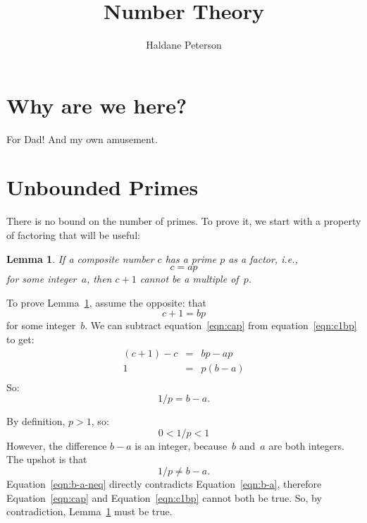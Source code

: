 \documentclass[twocolumn]{article}
\title{Number Theory}
\author{Haldane Peterson}
\newtheorem{lemma}{Lemma}
\begin{document}
\maketitle

\section{Why are we here?}

For Dad!
And my own amusement.

\section{Unbounded Primes}

There is no bound on the number of primes.
To prove it, we start with a property of factoring that will be
useful:

\begin{lemma}
\label{lemma:next-composite}
If a composite number $c$ has a prime $p$ as a factor, i.e.,
\begin{equation}
c = a p
\label{eqn:cap}
\end{equation}
for some integer~$a$, then $c+1$ \emph{cannot} be a multiple of~$p$.
\end{lemma}

To prove Lemma~\ref{lemma:next-composite}, assume the opposite:  that
\begin{equation}
c + 1 = b p
\label{eqn:c1bp}
\end{equation}
for some integer~$b$.
We can subtract equation~\ref{eqn:cap} from
equation~\ref{eqn:c1bp} to get:
\begin{eqnarray*}
(c + 1) - c & = & b p - a p \\
1 & = & p (b - a) \\
\end{eqnarray*}
So:
\begin{equation}
\label{eqn:b-a}
1 / p = b - a.
\end{equation}

By definition, $p > 1$, so:
\begin{equation*}
0 < 1 / p < 1
\end{equation*}
However, the difference $b-a$ is an integer, because~$b$ and~$a$ are
both integers.
The upshot is that
\begin{equation}
\label{eqn:b-a-neq}
1 / p \neq b - a.
\end{equation}
Equation~\ref{eqn:b-a-neq} directly contradicts
Equation~\ref{eqn:b-a},
therefore Equation~\ref{eqn:cap} and Equation~\ref{eqn:c1bp} cannot
both be true.
So, by contradiction, Lemma~\ref{lemma:next-composite} must be true.
\end{document}

